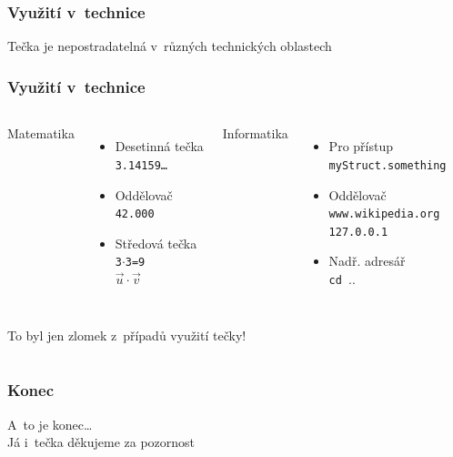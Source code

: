 \documentclass{beamer}
\begin{document}
    \section[Technika]{}
    \begin{frame}
        \frametitle{Využití v~technice}
        Tečka je nepostradatelná v~různých technických oblastech
    \end{frame}
    \begin{frame}
        \frametitle{Využití v~technice}
        \begin{columns}
            \alert{Matematika}\\
            \begin{itemize}
                \item<2-> Desetinná tečka\\\texttt{3.14159\dots}
                \item<3-> Oddělovač\\\texttt{42.000}
                \item<4-> Středová tečka\\\texttt{3$\cdot$3=9}\\\texttt{$\vec{u}\cdot\vec{v}$}
            \end{itemize}
            \pause[5]
            \alert{Informatika}\\
            \begin{itemize}
                \item<6-> Pro přístup\\\texttt{myStruct.something}
                \item<7-> Oddělovač\\\texttt{www.wikipedia.org}\\\texttt{127.0.0.1}
                \item<8-> Nadř. adresář\\\texttt{cd $..$}
            \end{itemize}
        \end{columns}
        \pause[9]
        \vspace{4mm}
        To byl jen zlomek z~případů využití tečky!
    \end{frame}
    \section[Konec]{}
    \begin{frame}
        \begin{center}
            \frametitle{Konec}
            \alert{A~to je konec\dots}\\
            \vspace{1cm}
            Já i~tečka děkujeme za pozornost \Smiley{}
        \end{center}
    \end{frame}
\end{document}
